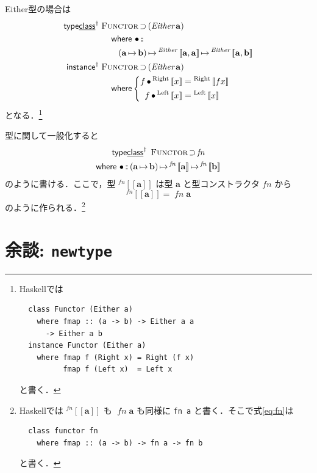 \documentclass[a4paper,twocolumn]{jsbook}
\def\[{\left[\!\left[}
\def\]{\right]\!\right]}
\newcommand{\programminglanguage}[1]{\textsf{#1}}
\newcommand{\haskell}{\programminglanguage{Haskell}}
\newcommand{\code}[1]{\texttt{#1}}
\newcommand{\mKeyword}[1]{\mathsf{#1}} %
\newcommand{\mKeywordUnderline}[1]{\text{\underline{\textsf{#1}}}} %
\newcommand{\mInstanceKeyword}{\mKeyword{instance}}
\newcommand{\mTypeClassKeyword}{\mKeyword{type}\mKeywordUnderline{class}}
\newcommand{\mWhereKeyword}{\mKeyword{where}}
\DeclareMathOperator{\mInstanceParametric}{\mInstanceKeyword^{\dagger}}
\DeclareMathOperator{\mSuperSet}{\supset}
\DeclareMathOperator{\mTypeClassParametric}{\mTypeClassKeyword^\dagger}
\DeclareMathOperator{\mWhere}{\mWhereKeyword}
\DeclareMathOperator{\mIn}{{:\!:}}
\DeclareMathOperator{\mMap}{\bullet}
\DeclareMathOperator{\mMapsTo}{\mapsto}
\newcommand{\mSpecialSub}[1]{\text{#1}}
\newcommand{\mLeft}{\mSpecialSub{Left}}
\newcommand{\mRight}{\mSpecialSub{Right}}
\newcommand{\mType}[1]{\mathbf{#1}}
\newcommand{\mTypeConstructor}[1]{\textit{#1}}
\DeclareMathOperator{\mEitherTypeConstructor}{\mTypeConstructor{Either}}
\newcommand{\mGenericTypeAssemble}[2]{{}^{\mTypeConstructor{#1}}\[\mType{#2}\]}
\newcommand{\mGenericTypeAssembleII}[3]{{}^{\mTypeConstructor{#1}}\[\mType{#2},\mType{#3}\]}
\newcommand{\mEitherType}[2]{\mGenericTypeAssembleII{Either}{#1}{#2}}
\newcommand{\mGenericValueConstructor}[1]{\mathrm{#1}}
\newcommand{\mGenericWith}[2]{{}^\mGenericValueConstructor{#1}\[#2\]}
\newcommand{\mLeftWith}[1]{\mGenericWith{\mLeft}{#1}}
\newcommand{\mRightWith}[1]{\mGenericWith{\mRight}{#1}}
\newcommand{\mGenericTypeClass}[1]{\textsc{#1}} %
\newcommand{\mFunctorTypeClass}{\mGenericTypeClass{Functor}}
\newcommand{\mProj}[2]{#1\mMapsTo#2}
\begin{document}
Either型の場合は
\begin{align}
\mTypeClassParametric\;
&\mFunctorTypeClass\mSuperSet{}(\mathop{\mEitherTypeConstructor}\mType{a})\nonumber\\
&\quad\mWhere{}
\mMap\mIn{}\nonumber\\
&\qquad\mProj{(\mProj{\mType{a}}{\mType{b}})}{\mProj{\mEitherType{a}{a}}{\mEitherType{a}{b}}}\\
\mInstanceParametric\;
&\mFunctorTypeClass\mSuperSet{}(\mathop{\mEitherTypeConstructor}\mType{a})\nonumber\\
&\quad\mWhere
\left\{
\begin{aligned}
f\mMap{}\mRightWith{x}&=\mRightWith{fx}\\
f\mMap{}\mLeftWith{x}&=\mLeftWith{x}
\end{aligned}
\right.
\end{align}
となる．\footnote{\haskell では
\begin{verbatim}
  class Functor (Either a)
    where fmap :: (a -> b) -> Either a a
      -> Either a b
  instance Functor (Either a)
    where fmap f (Right x) = Right (f x)
          fmap f (Left x)  = Left x
\end{verbatim}
と書く．}

型に関して一般化すると
\begin{multline}
\label{eq:fn}
\mTypeClassParametric\;\mFunctorTypeClass\mSuperSet\mTypeConstructor{fn}\\
\mWhere{}
\mMap\mIn{}\mProj{(\mProj{\mType{a}}{\mType{b}})}{\mProj{\mGenericTypeAssemble{fn}{a}}{\mGenericTypeAssemble{fn}{b}}}
\end{multline}
のように書ける．ここで，型 $\mGenericTypeAssemble{fn}{a}$ は型 $\mType{a}$ と型コンストラクタ $\mTypeConstructor{fn}$ から
\begin{equation}
\mGenericTypeAssemble{fn}{a}=\mathop{\mTypeConstructor{fn}}\mType{a}
\end{equation}
のように作られる．\footnote{\haskell では $\mGenericTypeAssemble{fn}{a}$ も $\mathop{\mTypeConstructor{fn}}\mType{a}$ も同様に \code{fn a} と書く．そこで式\eqref{eq:fn}は
\begin{verbatim}
  class functor fn
    where fmap :: (a -> b) -> fn a -> fn b
\end{verbatim}
と書く．}

\section{余談: \code{newtype}}
\end{document}
